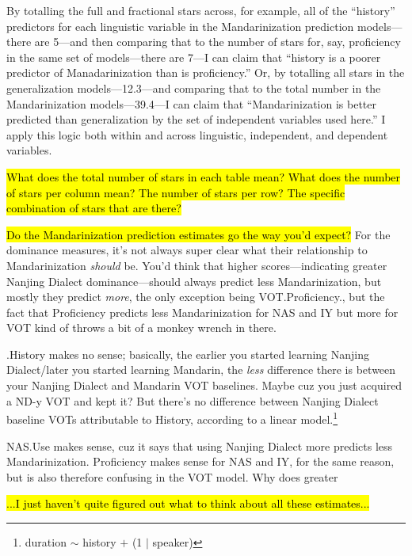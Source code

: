 By totalling the full and fractional stars across, for example, all of the ``history'' predictors for each linguistic variable in the Mandarinization prediction models---there are 5---and then comparing that to the number of stars for, say, proficiency in the same set of models---there are 7---I can claim that ``history is a poorer predictor of Manadarinization than is proficiency.'' Or, by totalling all stars in the generalization models---12.3---and comparing that to the total number in the Mandarinization models---39.4---I can claim that ``Mandarinization is better predicted than generalization by the set of independent variables used here.'' I apply this logic both within and across linguistic, independent, and dependent variables.

\hl{What does the total number of stars in each table mean? What does the number of stars per column mean? The number of stars per row? The specific combination of stars that are there?}

\hl{Do the Mandarinization prediction estimates go the way you'd expect?} For the dominance measures, it's not always super clear what their relationship to Mandarinization \emph{should} be. You'd think that higher scores---indicating greater Nanjing Dialect dominance---should always predict less Mandarinization, but mostly they predict \emph{more}, the only exception being VOT.Proficiency., but the fact that Proficiency predicts less Mandarinization for NAS and IY but more for VOT kind of throws a bit of a monkey wrench in there.

.History makes no sense; basically, the earlier you started learning Nanjing Dialect\slash later you started learning Mandarin, the \emph{less} difference there is between your Nanjing Dialect and Mandarin VOT baselines. Maybe cuz you just acquired a ND-y VOT and kept it? But there's no difference between Nanjing Dialect baseline VOTs attributable to History, according to a linear model.\footnote{duration $\sim$ history $+$ (1 $|$ speaker)}

NAS.Use makes sense, cuz it says that using Nanjing Dialect more predicts less Mandarinization. Proficiency makes sense for NAS and IY, for the same reason, but is also therefore confusing in the VOT model. Why does greater 

\hl{...I just haven't quite figured out what to think about all these estimates...}